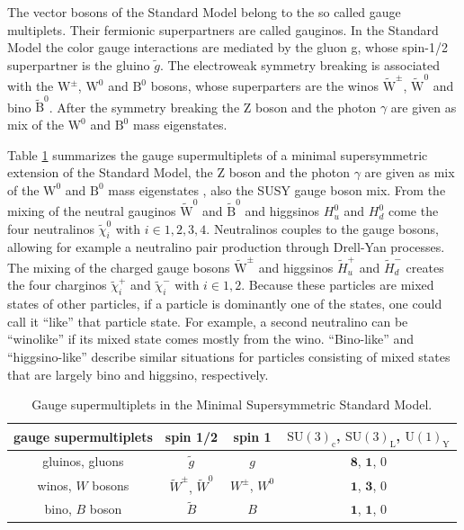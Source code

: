 The vector bosons of the Standard Model belong to the so called gauge multiplets. Their fermionic superpartners are called gauginos. In the Standard Model the color gauge interactions are mediated by the gluon g, whose spin-1/2 superpartner is the gluino $\widetilde{g}$. The electroweak symmetry breaking is associated with the $\text{W}^{\pm}$, $\text{W}^{0}$ and $\text{B}^{0}$ bosons, whose superparters are the winos $\widetilde{\text{W}}^{\pm}$, $\widetilde{\text{W}}^{0}$ and bino $\widetilde{\text{B}}^{0}$. After the symmetry breaking the Z boson and the photon $\gamma$ are given as mix of the $\text{W}^{0}$ and $\text{B}^{0}$ mass eigenstates. 

 Table \ref{fig:gauge_supermultiplets} summarizes the gauge supermultiplets of a minimal supersymmetric extension of the Standard Model, the Z boson and the photon $\gamma$ are given as mix of the $\text{W}^{0}$ and $\text{B}^{0}$ mass eigenstates \cite{PhysRevD.13.974}, also the SUSY gauge boson mix. From the mixing of the neutral gauginos $\widetilde{\text{W}}^{0}$ and $\widetilde{\text{B}}^{0}$ and higgsinos $H^{0}_{u}$ and $H^{0}_{d}$ come the four neutralinos $\widetilde{\chi}^{0}_{i}$ with $i \in 1,2,3,4$. Neutralinos couples to the gauge bosons, allowing for example a neutralino pair production through Drell-Yan processes. The mixing of the charged gauge bosons $\widetilde{\text{W}}^{\pm}$ and higgsinos $\widetilde{H}^{+}_{u}$ and $\widetilde{H}^{-}_{d}$ creates the four charginos $\widetilde{\chi}^{+}_{i}$ and $\widetilde{\chi}^{-}_{i}$ with $i \in 1,2$. Because these particles are mixed states of other particles, if a particle is dominantly one of the states, one could call it “like” that particle state. For example, a second neutralino can be “winolike” if its mixed state comes mostly from the wino. “Bino-like” and “higgsino-like” describe similar situations for particles consisting of mixed states that are largely bino and higgsino, respectively.

\begin{table}[tbh!]
\centering
\begin{tabular}{|c || c | c | c |}
	\hline
	gauge supermultiplets & spin 1/2 & spin 1 & $\mathrm{SU}(3)_{\mathrm{c}}$, $\mathrm{SU}(3)_{\mathrm{L}}$, $\mathrm{U}(1)_{\mathrm{Y}}$\\\hline\hline
	gluinos, gluons & $\widetilde{g}$ & $g$ & $\mathbf{8}$, $\mathbf{1}$, 0\\\hline
	winos, $W$ bosons & $\widetilde{W}^\pm$, $\widetilde{W}^0$ & $W^\pm$, $W^0$ &   $\mathbf{1}$, $\mathbf{3}$, 0\\\hline
	bino, $B$ boson & $\widetilde{B}$ & $B$ &   $\mathbf{1}$, $\mathbf{1}$, 0\\\hline
\end{tabular}
	\caption{Gauge supermultiplets in the Minimal Supersymmetric Standard Model.}
	\label{fig:gauge_supermultiplets}
\end{table}

